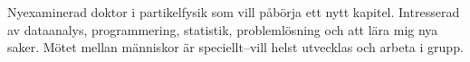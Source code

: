 

\begin{cvparagraph}

Nyexaminerad doktor i partikelfysik som vill p{\aa}b{\"o}rja ett nytt kapitel. %
Intresserad av dataanalys, programmering, statistik, problemlösning och att lära mig nya saker. %
Mötet mellan människor är speciellt–vill helst utvecklas och arbeta i grupp. %
\end{cvparagraph}